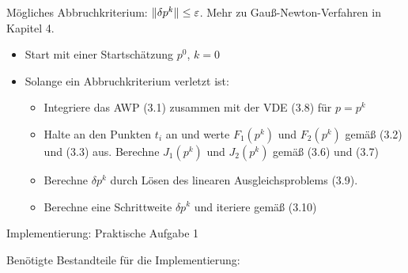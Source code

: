 
Mögliches Abbruchkriterium: $\|\delta p^k \| \leq \varepsilon$. Mehr zu Gauß-Newton-Verfahren in Kapitel\,\,4.


\begin{itemize}
\item Start mit einer Startschätzung $p^0$, $k=0$
\item Solange ein Abbruchkriterium verletzt ist:
\begin{itemize}
\item Integriere das AWP (3.1) zusammen mit der VDE (3.8) für $p=p^k$
\item Halte an den Punkten $t_i$ an und werte $F_1(p^k)$ und $F_2(p^k)$ gemäß (3.2) und (3.3) aus. Berechne $J_1(p^k)$ und $J_2(p^k)$ gemäß (3.6) und (3.7)
\item Berechne $\delta p^k$ durch Lösen des linearen Ausgleichsproblems (3.9).
\item Berechne eine Schrittweite $\delta p^k$ und iteriere gemäß (3.10)
\end{itemize}
\end{itemize}

Implementierung: Praktische Aufgabe 1

Benötigte Bestandteile für die Implementierung:

